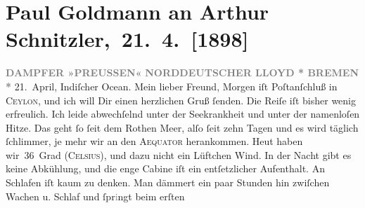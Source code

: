 

         
         \renewcommand{\erwaehntePersonen}{Personen: Richard Beer-Hofmann, Marie Reinhard}
         \renewcommand{\erwaehnteInstitutionen}{Institutionen: Norddeutscher Lloyd, Preussen}
         \renewcommand{\erwaehnteOrte}{Orte: Bad Ischl, Bremen, China, Deutsches Postamt in Shanghai, Indischer Ozean, Rotes Meer, Sri Lanka, Wien}
         \renewcommand{\erwaehnteWerke}{}
               \section[ Paul Goldmann an Arthur Schnitzler, 21. 4. {[}1898{]}]{ Paul Goldmann an Arthur Schnitzler, 21. 4. {[}1898{]}}\nopagebreak{}\rehead{ }\begin{ledgroupsized}[t]{13cm}\normalsize\beginnumbering \toendnotes[C]{\smallbreak\pagebreak[2]} 
\toendnotes[C]{\smallbreak}\pstart
           \noindent{}\centering{}{\pb}\textcolor{gray}{\textbf{DAMPFER »PREUSSEN«}}\pend
           \pstart
           \noindent{}\textcolor{gray}{\textbf{NORDDEUTSCHER LLOYD * BREMEN *}}\pend
           \pstart
           \raggedleft{}21. April, Indiſcher Ocean.\pend
           \pstart\center{}Mein lieber Freund,\pend\pstart
           Morgen iſt Poſtanſchluß in \textsc{Ceylon}, und ich will Dir einen herzlichen Gruß ſenden.\pend
           \pstart
           Die Reiſe iſt bisher wenig erfreulich. Ich leide abwechſelnd unter der Seekrankheit
               und unter der namenloſen Hitze. Das geht ſo ſeit dem Rothen Meer, alſo ſeit zehn Tagen {\pb}und es wird täglich ſchlimmer, je mehr wir an den
                  \textsc{Aequator} herankommen. Heut haben wir 36 Grad (\textsc{Celsius}), und dazu nicht
               ein Lüftchen Wind. In der Nacht gibt es keine Abkühlung, und die enge Cabine iſt ein
               entſetzlicher Aufenthalt. An Schlafen iſt kaum zu denken. Man dämmert ein paar
               Stunden hin zwiſchen Wachen u. Schlaf und ſpr\textcolor{gray}{i}ngt beim erſten

\end{ledgroupsized}
